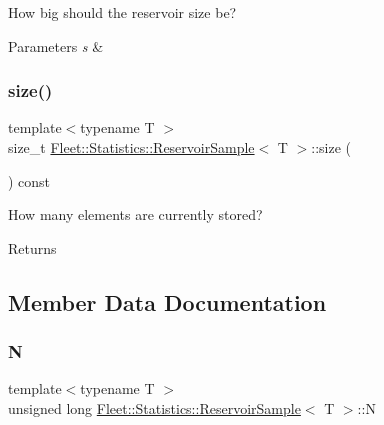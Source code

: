 How big should the reservoir size be? 
\begin{DoxyParams}{Parameters}
{\em s} & \\
\hline
\end{DoxyParams}
\mbox{\label{class_fleet_1_1_statistics_1_1_reservoir_sample_abdfad455c8b8da8cb2ab30d0f60053e0}} 
\subsubsection{\texorpdfstring{size()}{size()}}
{\footnotesize\ttfamily template$<$typename T $>$ \\
size\+\_\+t \hyperlink{class_fleet_1_1_statistics_1_1_reservoir_sample}{Fleet\+::\+Statistics\+::\+Reservoir\+Sample}$<$ T $>$\+::size (\begin{DoxyParamCaption}{ }\end{DoxyParamCaption}) const\hspace{0.3cm}{\ttfamily [inline]}}

How many elements are currently stored? \begin{DoxyReturn}{Returns}

\end{DoxyReturn}


\subsection{Member Data Documentation}
\mbox{\label{class_fleet_1_1_statistics_1_1_reservoir_sample_a1e0c5104f173107e23900ff707df05ab}} 
\subsubsection{\texorpdfstring{N}{N}}
{\footnotesize\ttfamily template$<$typename T $>$ \\
unsigned long \hyperlink{class_fleet_1_1_statistics_1_1_reservoir_sample}{Fleet\+::\+Statistics\+::\+Reservoir\+Sample}$<$ T $>$\+::N}

